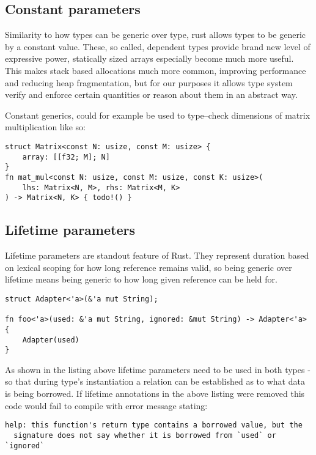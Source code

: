 \subsection{Constant parameters}

Similarity to how types can be generic over type, rust allows types to be generic by a constant value. These, so called, dependent types
provide brand new level of expressive power, statically sized arrays especially become much more useful. This makes stack based allocations much more common,
improving performance and reducing heap fragmentation, but for our purposes it allows type system verify and enforce certain quantities or reason about them in an abstract way.

Constant generics, could for example be used to type--check dimensions of matrix multiplication like so:

\begin{lstlisting}
struct Matrix<const N: usize, const M: usize> {
    array: [[f32; M]; N]
}
fn mat_mul<const N: usize, const M: usize, const K: usize>(
    lhs: Matrix<N, M>, rhs: Matrix<M, K>
) -> Matrix<N, K> { todo!() }
\end{lstlisting}

\subsection{Lifetime parameters}

Lifetime parameters are standout feature of Rust. They represent duration based on lexical scoping for how long reference remains valid, so being generic over lifetime means being generic
to how long given reference can be held for.

\begin{lstlisting}[basicstyle=\small]    
struct Adapter<'a>(&'a mut String);

fn foo<'a>(used: &'a mut String, ignored: &mut String) -> Adapter<'a> {
    Adapter(used)
}
\end{lstlisting}

As shown in the listing above lifetime parameters need to be used in both types - so that during type's instantiation
a relation can be established as to what data is being borrowed. If lifetime annotations in the above listing were removed
this code would fail to compile with error message stating:

\begin{verbatim}
help: this function's return type contains a borrowed value, but the 
  signature does not say whether it is borrowed from `used` or `ignored`
\end{verbatim}

